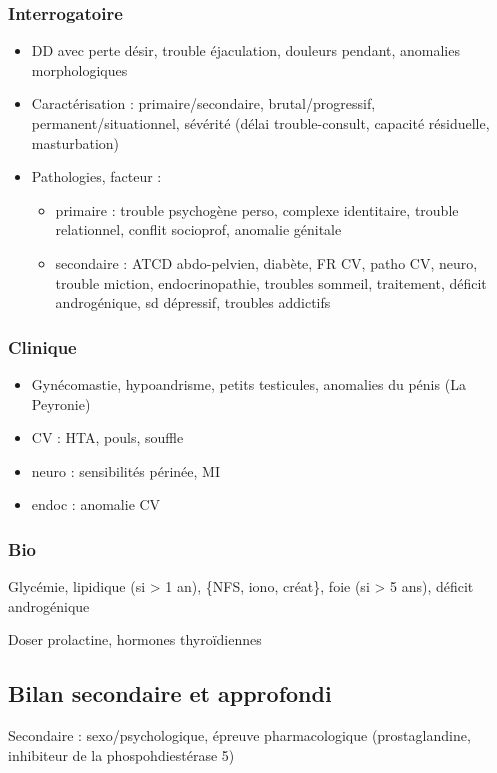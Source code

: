 \documentclass{book}
\begin{document}
\subsubsection{Interrogatoire}
\label{sec:org3fb5727}
\begin{itemize}
\item DD avec perte désir, trouble éjaculation, douleurs pendant, anomalies morphologiques
\item Caractérisation : primaire/secondaire, brutal/progressif,
permanent/situationnel, sévérité (délai trouble-consult, capacité résiduelle,
masturbation)
\item Pathologies, facteur :
\begin{itemize}
\item primaire : trouble psychogène perso, complexe identitaire, trouble
relationnel, conflit socioprof, anomalie génitale
\item secondaire : ATCD abdo-pelvien, diabète, FR CV, patho CV, neuro, trouble
miction, endocrinopathie, troubles sommeil, traitement, déficit
androgénique, sd dépressif, troubles addictifs
\end{itemize}
\end{itemize}
\subsubsection{Clinique}
\label{sec:org72e21d7}
\begin{itemize}
\item Gynécomastie, hypoandrisme, petits testicules, anomalies du pénis (La Peyronie)
\item CV : HTA, pouls, souffle
\item neuro : sensibilités périnée, MI
\item endoc : anomalie CV
\end{itemize}
\subsubsection{Bio}
\label{sec:org8d9d7b2}
Glycémie, lipidique (si > 1 an), \{NFS, iono, créat\}, foie (si > 5 ans), déficit
androgénique

Doser prolactine, hormones thyroïdiennes

\subsection{Bilan secondaire et approfondi}
\label{sec:org174cc00}
Secondaire : sexo/psychologique, épreuve pharmacologique (prostaglandine,
inhibiteur de la phospohdiestérase 5)
\end{document}
